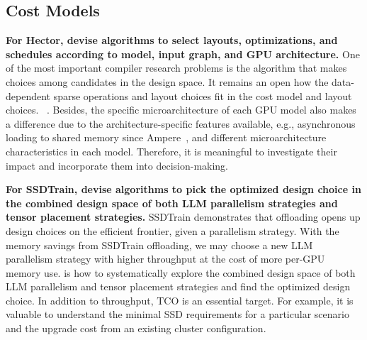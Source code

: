 \subsection{Cost Models}
\noindent
\textbf{For Hector, devise algorithms to select layouts, optimizations, and schedules according to model, input graph, and GPU architecture.} One of the most important compiler research problems is the algorithm that makes choices among candidates in the design space. It remains an open  how the data-dependent sparse operations and layout choices fit in the cost model and layout choices. ~\cite{zhaoBridgingGapDeep2018,almasriParallelizingMaximalClique2023,kawtikwarHyLACHybridLinear2024}. Besides, the specific microarchitecture of each GPU model also makes a difference due to the architecture-specific features available, e.g., asynchronous loading to shared memory since Ampere~\cite{nvidiaControllingDataMovement2020}, and different microarchitecture characteristics in each model. Therefore, it is meaningful to investigate their impact and incorporate them into decision-making.

\noindent
\textbf{For SSDTrain, devise algorithms to pick the optimized design choice in the combined design space of both LLM parallelism strategies and tensor placement strategies.} SSDTrain demonstrates that offloading opens up design choices on the efficient frontier, given a parallelism strategy. With the memory savings from SSDTrain offloading, we may choose a new LLM parallelism strategy with higher throughput at the cost of more per-GPU memory use.   is how to systematically explore the combined design space of both LLM parallelism and tensor placement strategies and find the optimized design choice. In addition to throughput, TCO is an essential target. For example, it is valuable to understand the minimal SSD requirements for a particular scenario and the upgrade cost from an existing cluster configuration.

